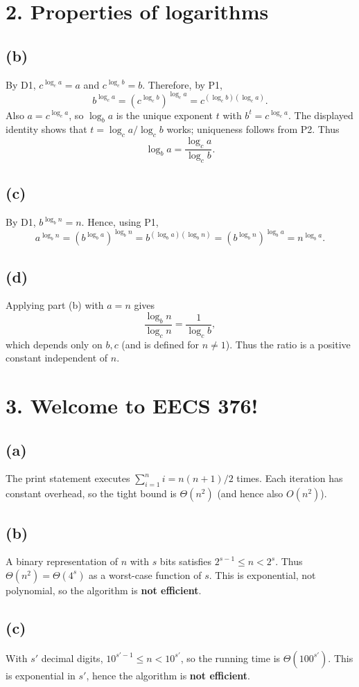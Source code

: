 \documentclass[11pt]{article}
\begin{document}
\section*{2. Properties of logarithms}
\subsection*{(b)} By D1, $c^{\log_c a}=a$ and $c^{\log_c b}=b$.  Therefore, by P1,
\[
b^{\log_c a}=\left(c^{\log_c b}\right)^{\log_c a}=c^{(\log_c b)(\log_c a)}.
\]
Also $a=c^{\log_c a}$, so $\log_b a$ is the unique exponent $t$ with
$b^t=c^{\log_c a}$.  The displayed identity shows that
$t=\log_c a/\log_c b$ works; uniqueness follows from P2.  Thus
\[
\boxed{\log_b a=\frac{\log_c a}{\log_c b}}.
\]
\subsection*{(c)} By D1, $b^{\log_b n}=n$.  Hence, using P1,
\[
a^{\log_b n}=\left(b^{\log_b a}\right)^{\log_b n}
=b^{(\log_b a)(\log_b n)}
=\left(b^{\log_b n}\right)^{\log_b a}=n^{\log_b a}.
\]
\subsection*{(d)} Applying part (b) with $a=n$ gives
\[
\frac{\log_b n}{\log_c n}=\frac{1}{\log_c b},
\]
which depends only on $b,c$ (and is defined for $n\ne1$).  Thus the ratio is a positive constant independent of $n$.

\section*{3. Welcome to EECS 376!}
\subsection*{(a)} The print statement executes $\sum_{i=1}^n i=n(n+1)/2$ times.  Each iteration has constant overhead, so the tight bound is $\boxed{\Theta(n^2)}$ (and hence also $O(n^2)$).
\subsection*{(b)} A binary representation of $n$ with $s$ bits satisfies $2^{s-1}\le n<2^s$.  Thus $\Theta(n^2)=\Theta(4^s)$ as a worst-case function of $s$.  This is exponential, not polynomial, so the algorithm is \textbf{not efficient}.
\subsection*{(c)} With $s'$ decimal digits, $10^{s'-1}\le n<10^{s'}$, so the running time is $\Theta(100^{s'})$.  This is exponential in $s'$, hence the algorithm is \textbf{not efficient}.
\end{document}
